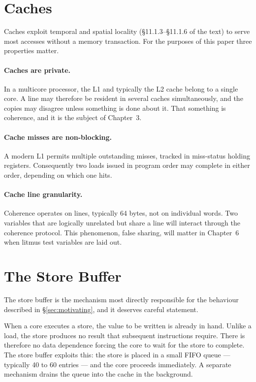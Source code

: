 \section{Caches}
\label{sec:caches}

Caches exploit temporal and spatial locality (\S11.1.3--\S11.1.6 of the text) to
serve most accesses without a memory transaction.
For the purposes of this paper
three properties matter.

\paragraph{Caches are private.} In a multicore processor, the L1 and typically
the L2 cache belong to a single core.
A line may therefore be resident in several
caches simultaneously, and the copies may disagree unless something is done about
it.
That something is coherence, and it is the subject of Chapter~3.

\paragraph{Cache misses are non-blocking.} A modern L1 permits multiple
outstanding misses, tracked in miss-status holding registers.
Consequently two
loads issued in program order may complete in either order, depending on which
one hits.

\paragraph{Cache line granularity.} Coherence operates on lines, typically 64
bytes, not on individual words.
Two variables that are logically unrelated but
share a line will interact through the coherence protocol.
This phenomenon,
false sharing, will matter in Chapter~6 when litmus test variables are laid out.

\section{The Store Buffer}
\label{sec:storebuffer}

The store buffer is the mechanism most directly responsible for the behaviour
described in \S\ref{sec:motivating}, and it deserves careful statement.

When a core executes a store, the value to be written is already in hand.
Unlike
a load, the store produces no result that subsequent instructions require.
There
is therefore no data dependence forcing the core to wait for the store to
complete.
The store buffer exploits this: the store is placed in a small FIFO
queue --- typically 40 to 60 entries --- and the core proceeds immediately.
A
separate mechanism drains the queue into the cache in the background.

